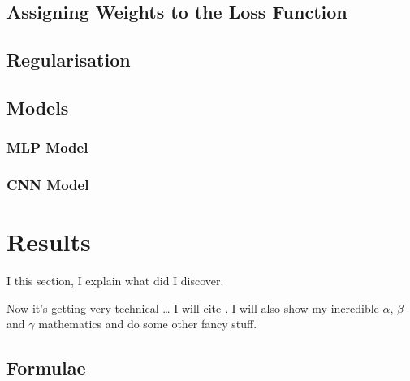 \documentclass[11pt,twoside]{article}
\numberwithin{Theorem}{section}
\numberwithin{Definition}{section}
\numberwithin{Lemma}{section}
\numberwithin{Algorithm}{section}
\numberwithin{equation}{section}
\begin{document}
\subsection{Assigning Weights to the Loss Function}

\subsection{Regularisation}

\subsection{Models}
\subsubsection{MLP Model}

\subsubsection{CNN Model}

\section{Results}
\label{sec:results}
I this section, I explain what did I discover.

Now it's getting very technical \ldots{} I will cite \cite{shiina,groewe2001}. I will also show my incredible $\alpha$, $\beta$ and $\gamma$ mathematics and do some other fancy stuff.

\subsection{Formulae}
\end{document}
